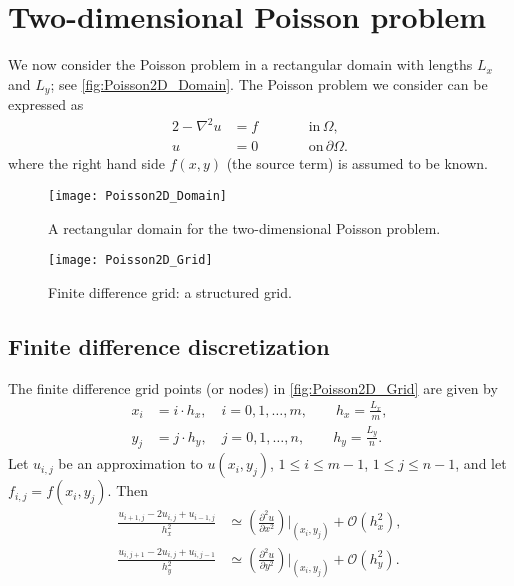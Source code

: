 \section{Two-dimensional Poisson problem}

We now consider the Poisson problem in a rectangular domain with lengths $L_x$
and $L_y$; see \autoref{fig:Poisson2D_Domain}. The Poisson problem we consider
can be expressed as
\begin{alignat*}{2}
  -\nabla^2 u &= f & \qquad &\text{in}\, \Omega, \\
  u &= 0 & \qquad & \text{on}\, \partial \Omega.
\end{alignat*}
where the right hand side $f(x,y)$ (the source term) is assumed to be known.

\begin{figure}
  \centering
  \texttt{[image: Poisson2D\_Domain]}
  \caption{A rectangular domain for the two-dimensional Poisson problem.}
  \label{fig:Poisson2D_Domain}
\end{figure}

\begin{figure}
  \centering
  \texttt{[image: Poisson2D\_Grid]}
  \caption{Finite difference grid: a structured grid.}
  \label{fig:Poisson2D_Grid}
\end{figure}

\subsection{Finite difference discretization}

The finite difference grid points (or nodes) in \autoref{fig:Poisson2D_Grid} are
given by
\begin{align*}
  x_i &= i \cdot h_x, \quad i=0,1,\ldots,m, \qquad h_x = \frac{L_x}{m}, \\
  y_j &= j \cdot h_y, \quad j=0,1,\ldots,n, \qquad h_y = \frac{L_y}{n}.
\end{align*}
Let $u_{i,j}$ be an approximation to $u(x_i,y_j)$, $1\leq i\leq m-1$, $1\leq
j\leq n-1$, and let $f_{i,j} = f(x_i,y_j)$. Then
\begin{align*}
  \frac{u_{i+1,j} - 2 u_{i,j} + u_{i-1,j}}{h_x^2}
  &\simeq \left( \frac{\partial^2 u}{\partial x^2} \right) \biggl|_{(x_i,y_j)} + \mathcal{O}(h_x^2), \\
  \frac{u_{i,j+1} - 2 u_{i,j} + u_{i,j-1}}{h_y^2}
  &\simeq \left( \frac{\partial^2 u}{\partial y^2} \right) \biggl|_{(x_i,y_j)} + \mathcal{O}(h_y^2).
\end{align*}


